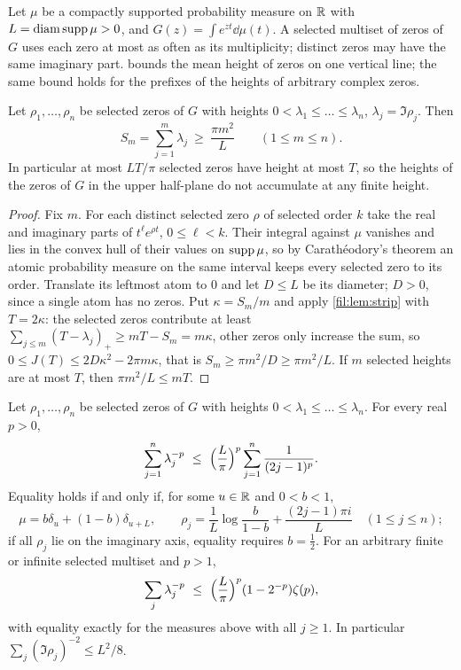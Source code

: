 Let $\mu$ be a compactly supported probability measure on $\mathbb{R}$ with $L=\operatorname{diam}\operatorname{supp}\mu>0$, and $G(z)=\int e^{zt}\dd\mu(t)$. A
selected multiset of zeros of $G$ uses each zero at most as often as its multiplicity; distinct zeros may have the
same imaginary part.  bounds the mean height of zeros on one vertical line; the same bound holds
for the prefixes of the heights of arbitrary complex zeros.

\begin{proposition}\label{zfg:prop:prefix}
Let $\rho_1,\dots,\rho_n$ be selected zeros of $G$ with heights $0<\lambda_1\le\dots\le\lambda_n$, $\lambda_j=\Im\rho_j$. Then
\[
 S_m=\sum_{j=1}^m\lambda_j\ \ge\ \frac{\pi m^2}L\qquad(1\le m\le n).
\]
In particular at most $LT/\pi$ selected zeros have height at most $T$, so the heights of the zeros of $G$ in the upper
half-plane do not accumulate at any finite height.
\end{proposition}

\begin{proof}
Fix $m$. For each distinct selected zero $\rho$ of selected order $k$ take the real and imaginary parts of $t^\ell e^{\rho t}$,
$0\le\ell<k$. Their integral against $\mu$ vanishes and lies in the convex hull of their values on $\operatorname{supp}\mu$, so by
Carath\'eodory's theorem an atomic probability measure on the same interval keeps every selected zero to its order.
Translate its leftmost atom to $0$ and let $D\le L$ be its diameter; $D>0$, since a single atom has no zeros. Put
$\kappa=S_m/m$ and apply \cref{fil:lem:strip} with $T=2\kappa$: the selected zeros contribute at least
$\sum_{j\le m}(T-\lambda_j)_+\ge mT-S_m=m\kappa$, other zeros only increase the sum, so $0\le J(T)\le2D\kappa^2-2\pi m\kappa$, that is
$S_m\ge\pi m^2/D\ge\pi m^2/L$. If $m$ selected heights are at most $T$, then $\pi m^2/L\le mT$.
\end{proof}

\begin{theorem}\label{zfg:thm:recip}
Let $\rho_1,\dots,\rho_n$ be selected zeros of $G$ with heights $0<\lambda_1\le\dots\le\lambda_n$. For every real $p>0$,
\[
 \sum_{j=1}^n\lambda_j^{-p}\ \le\ \Bigl(\frac L\pi\Bigr)^p\sum_{j=1}^n\frac1{(2j-1)^p}.
\]
Equality holds if and only if, for some $u\in\mathbb{R}$ and $0<b<1$,
\[
 \mu=b\delta_u+(1-b)\delta_{u+L},\qquad \rho_j=\frac1L\log\frac b{1-b}+\frac{(2j-1)\pi i}L\quad(1\le j\le n);
\]
if all $\rho_j$ lie on the imaginary axis, equality requires $b=\tfrac12$. For an arbitrary finite or infinite selected
multiset and $p>1$,
\[
 \sum_j\lambda_j^{-p}\ \le\ \Bigl(\frac L\pi\Bigr)^p(1-2^{-p})\zeta(p),
\]
with equality exactly for the measures above with all $j\ge1$. In particular $\sum_j(\Im\rho_j)^{-2}\le L^2/8$.
\end{theorem}

